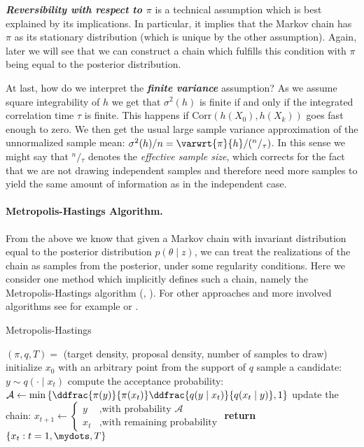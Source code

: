 \textbf{\emph{Reversibility with respect to $\pi$}} is a technical assumption which is best explained by its implications.
In particular, it implies that the Markov chain has $\pi$ as its stationary distribution (which is unique by the other assumption).
Again, later we will see that we can construct a chain which fulfills this condition with $\pi$ being equal to the posterior distribution.

At last, how do we interpret the \textbf{\emph{finite variance}} assumption?
As we assume square integrability of $h$ we get that $\sigma^2(h)$ is finite if and only if the integrated correlation time $\tau$ is finite.
This happens if $\text{Corr}(h(X_0), h(X_k))$ goes fast enough to zero.
We then get the usual large sample variance approximation of the unnormalized sample mean: $\sigma^2(h) / n = \varwrt{\pi}{h} / ({}^n/{}_\tau)$.
In this sense we might say that ${}^n/{}_\tau$ denotes the \emph{effective sample size}, which corrects for the fact that we are not drawing independent samples and therefore need more samples to yield the same amount of information as in the independent case.

\paragraph{Metropolis-Hastings Algorithm.}
From the above we know that given a Markov chain with invariant distribution equal to the posterior distribution $p(\theta \mid z)$, we can treat the realizations of the chain as samples from the posterior, under some regularity conditions.
Here we consider one method which implicitly defines such a chain, namely the Metropolis-Hastings algorithm (\citet{Metropolis1953}, \citet{hastings70}).
For other approaches and more involved algorithms see for example \citet{roberts2004} or \citet{liang10}.

\begin{algorithm}
\caption{Metropolis-Hastings}\label{alg:metropolis-hastings}
\begin{algorithmic}[1]
  \Require $(\pi, q, T) =$ (target density, proposal density, number of samples to draw)
\State initialize $x_0$ with an arbitrary point from the support of $q$
  \State sample a candidate: $y \sim q(\cdot \mid x_t)$
  \State compute the acceptance probability: $\mathcal{A} \gets \min\left\{ \ddfrac{\pi(y)}{\pi(x_t)} \ddfrac{q(y \mid x_t)}{q(x_t \mid y)}, 1\right\}$
  \State update the chain: $x_{t+1} \gets \begin{cases} y &\mbox{,with probability } \mathcal{A}\\ x_t &\mbox{,with remaining probability} \end{cases}$
\EndFor{}
\State \textbf{return} $\{x_t : t = 1,\mydots,T\}$
\end{algorithmic}
\end{algorithm}

